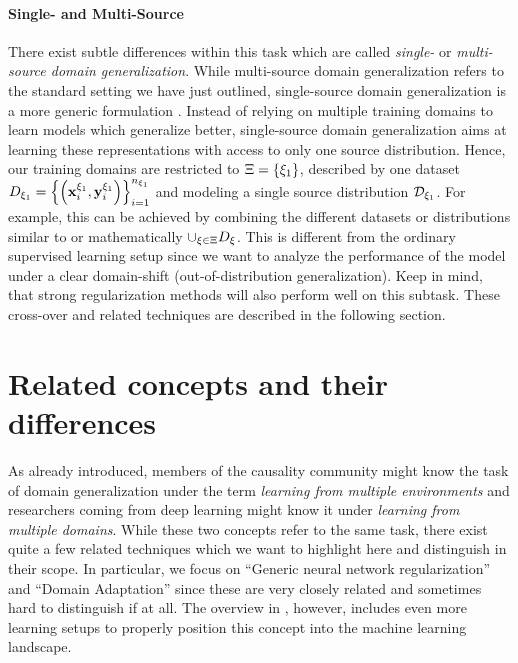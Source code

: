 \paragraph{Single- and Multi-Source}
There exist subtle differences within this task which are called \emph{single-} or \emph{multi-source domain generalization}. While multi-source domain generalization refers to the standard setting we have just outlined, single-source domain generalization is a more generic formulation \citep{zunino2020explainable}. Instead of relying on multiple training domains to learn models which generalize better, single-source domain generalization aims at learning these representations with access to only one source distribution. Hence, our training domains are restricted to $\Xi = \left\{\xi_1\right\}$, described by one dataset $D_{\xi_1}=\left\{\left(\mathbf{x}_i^{\xi_1}, \mathbf{y}_i^{\xi_1}\right)\right\}_{i=1}^{n_{\xi_1}}$ and modeling a single source distribution $\mathcal{D}_{\xi_1}$. For example, this can be achieved by combining the different datasets or distributions similar to  or mathematically $\cup_{\xi \in \Xi} D_\xi$. This is different from the ordinary supervised learning setup since we want to analyze the performance of the model under a clear domain-shift (\ie out-of-distribution generalization). Keep in mind, that strong regularization methods will also perform well on this subtask. These cross-over and related techniques are described in the following section.

\section{Related concepts and their differences}

As already introduced, members of the causality community might know the task of domain generalization under the term \emph{learning from multiple environments} \citep{arjovsky2019invariant, gulrajani2020search, PetBuhMei15} and researchers coming from deep learning might know it under \emph{learning from multiple domains}. While these two concepts refer to the same task, there exist quite a few related techniques which we want to highlight here and distinguish in their scope. In particular, we focus on ``Generic neural network regularization'' and ``Domain Adaptation'' since these are very closely related and sometimes hard to distinguish if at all. The overview in , however, includes even more learning setups to properly position this concept into the machine learning landscape.

